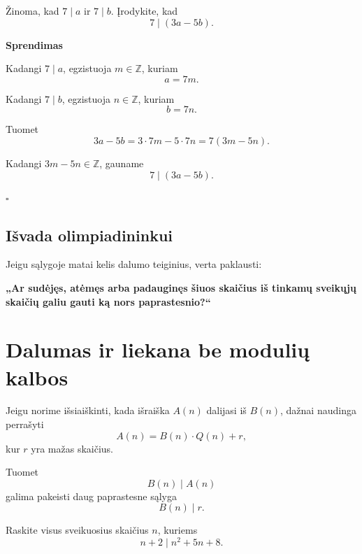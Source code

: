 \documentclass[11pt,a4paper]{scrartcl}
\newenvironment{solution}
    {\begin{list}{}{\setlength{\leftmargin}{10pt}\setlength{\rightmargin}{10pt}}\item[]}
    {\end{list}}
\begin{document}
\begin{example}

Žinoma, kad $7\mid a$ ir $7\mid b$. Įrodykite, kad
\[
7\mid (3a-5b).
\]

\end{example}

\begin{solution}
\textbf{Sprendimas}

Kadangi $7\mid a$, egzistuoja $m\in\mathbb Z$, kuriam
\[
a=7m.
\]

Kadangi $7\mid b$, egzistuoja $n\in\mathbb Z$, kuriam
\[
b=7n.
\]

Tuomet
\[
3a-5b=3\cdot 7m-5\cdot 7n=7(3m-5n).
\]

Kadangi $3m-5n\in\mathbb Z$, gauname
\[
7\mid(3a-5b).
\]

\hfill $\square$

\end{solution}

\subsection{Išvada olimpiadininkui}

Jeigu sąlygoje matai kelis dalumo teiginius, verta paklausti:

\begin{center}
\textbf{„Ar sudėjęs, atėmęs arba padauginęs šiuos skaičius iš tinkamų
sveikųjų skaičių galiu gauti ką nors paprastesnio?“}
\end{center}

\section{Dalumas ir liekana be modulių kalbos}

Jeigu norime išsiaiškinti, kada išraiška $A(n)$ dalijasi iš $B(n)$, dažnai
naudinga perrašyti
\[
A(n)=B(n)\cdot Q(n)+r,
\]
kur $r$ yra mažas skaičius.

Tuomet
\[
B(n)\mid A(n)
\]
galima pakeisti daug paprastesne sąlyga
\[
B(n)\mid r.
\]

\begin{example}

Raskite visus sveikuosius skaičius $n$, kuriems
\[
n+2\mid n^2+5n+8.
\]

\end{example}
\end{document}
